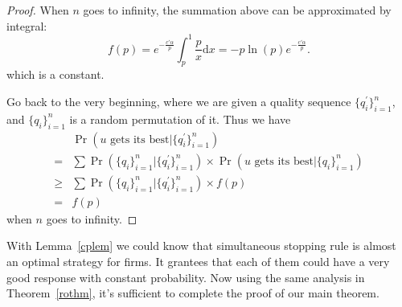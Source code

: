 \begin{proof}
When $n$ goes to infinity, the summation above can be approximated by integral:
$$f(p) = e^{-\frac{c' \alpha}{p}}\int_{p}^{1} \frac{p}{x} \mathrm{d}x = -p\ln(p)e^{-\frac{c' \alpha}{p}}.$$
which is a constant.

Go back to the very beginning, where we are given a quality sequence $\{q_i^\prime\}_{i=1}^n$,
and $\{q_i\}_{i=1}^n$ is a random permutation of it. Thus we have
\begin{align*}
    & \Pr(u\text{ gets its best} | \{q_i^\prime\}_{i=1}^n) \\
    = &\sum \Pr (\{q_i\}_{i=1}^n | \{q_i^\prime\}_{i=1}^n) \times \Pr(u\text{ gets its best} | \{q_i\}_{i=1}^n) \\
    \ge & \sum \Pr (\{q_i\}_{i=1}^n | \{q_i^\prime\}_{i=1}^n) \times f(p) \\
    = & f(p)
\end{align*}
when $n$ goes to infinity.
\end{proof}

With Lemma~\ref{cplem} we could know that simultaneous stopping rule is almost an optimal
strategy for firms. It grantees that each of them could have a very good response with constant probability.
Now using the same analysis in Theorem~\ref{rothm},
it's sufficient to complete the proof of our main theorem.



%
%
%
%

